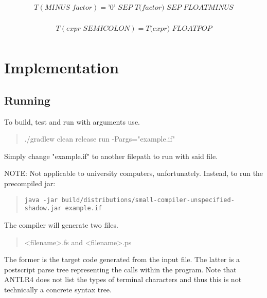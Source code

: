 \documentclass[a4paper,12pt]{article}
\begin{document}
\begin{landscape}
\begin{equation} 
\begin{aligned}
    T( \textit{MINUS factor}) = \textit{'0' SEP T(factor) SEP FLOATMINUS}\\
\end{aligned}
\end{equation}

\begin{equation} 
\begin{aligned}
    T( \textit{expr SEMICOLON})
    = \textit{T(expr) FLOATPOP} \\
\end{aligned}
\end{equation}

\section{Implementation}
\subsection{Running}
To build, test and run with arguments use.
\begin{quotation}
./gradlew clean release run -Pargs="example.if"
\end{quotation}
Simply change "example.if" to another filepath to run with said file.

NOTE: Not applicable to university computers, unfortunately. Instead, to run the precompiled jar:


\begin{quotation}
\begin{verbatim}
java -jar build/distributions/small-compiler-unspecified-shadow.jar example.if
\end{verbatim}

\end{quotation}

The compiler will generate two files.
\begin{quotation}
<filename>.fs and <filename>.ps
\end{quotation}
The former is the target code generated from the input file. The latter is a postscript parse tree representing the calls within the program. Note that ANTLR4 does not list the types of terminal characters and thus this is not technically a concrete syntax tree.

\end{landscape}
\end{document}
